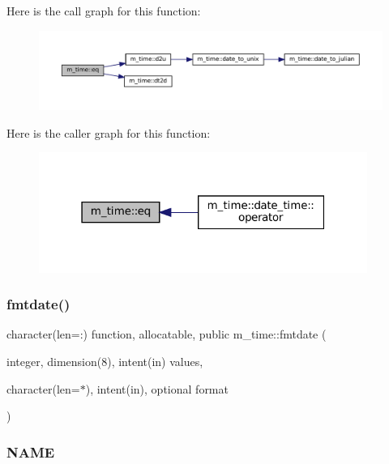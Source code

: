 Here is the call graph for this function\+:\nopagebreak
\begin{figure}[H]
\begin{center}
\leavevmode
\includegraphics[width=350pt]{namespacem__time_a7d365fb381fa8f5f79a4263c9f678b98_cgraph}
\end{center}
\end{figure}
Here is the caller graph for this function\+:\nopagebreak
\begin{figure}[H]
\begin{center}
\leavevmode
\includegraphics[width=304pt]{namespacem__time_a7d365fb381fa8f5f79a4263c9f678b98_icgraph}
\end{center}
\end{figure}
\mbox{\label{namespacem__time_a2cb84c9b8af4f395b76aed76e1431328}} 
\subsubsection{\texorpdfstring{fmtdate()}{fmtdate()}}
{\footnotesize\ttfamily character(len=\+:) function, allocatable, public m\+\_\+time\+::fmtdate (\begin{DoxyParamCaption}\item[{integer, dimension(8), intent(in)}]{values,  }\item[{character(len=$\ast$), intent(in), optional}]{format }\end{DoxyParamCaption})}



\subsubsection*{N\+A\+ME}

